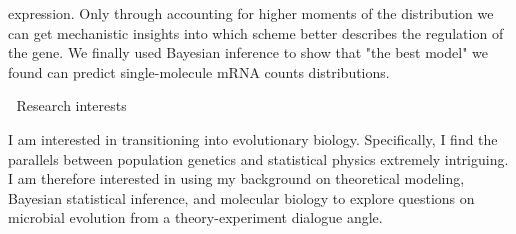 \begin{cventries}
{\begin{cvitems}
{\begin{flushleft}
              expression. Only through accounting for higher moments of the
              distribution we can get mechanistic insights into which scheme
              better describes the regulation of the gene. We finally used
              Bayesian inference to show that "the best model" we found can
              predict single-molecule mRNA counts distributions.
          \end{flushleft}
            }
          \end{cvitems}
        }
      \cventry
        {$\;$} %
        {Research interests} %
        {$\;$} %
        {$\;$} %
        {
          \begin{cvitems} %
            \item {
            \begin{flushleft}
              I am interested in transitioning into evolutionary biology.
              Specifically, I find the parallels between population genetics and
              statistical physics extremely intriguing. I am therefore
              interested in using my background on theoretical modeling,
              Bayesian statistical inference, and molecular biology to explore
              questions on microbial evolution from a theory-experiment dialogue
              angle.  
          \end{flushleft}
            }
          \end{cvitems}
        }
\end{cventries}